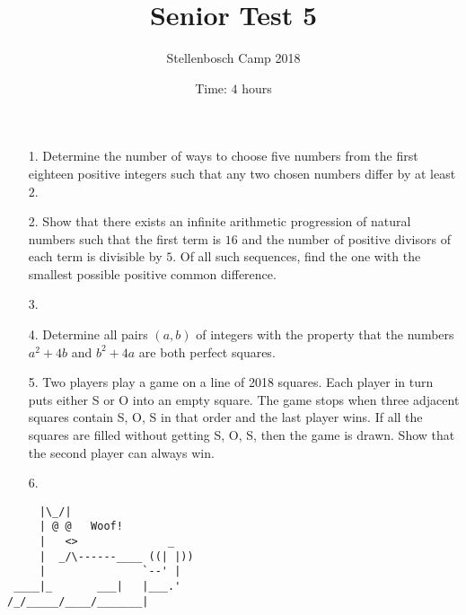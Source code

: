 \documentclass[a4paper, 12pt]{article}
\title{Senior Test 5}
\author{Stellenbosch Camp 2018}
\date{Time: $4$ hours}
\begin{document}
 \maketitle

\begin{enumerate}

\item[1.] Determine the number of ways to choose five numbers from the first eighteen positive integers such that any two chosen numbers differ by at least $2$.


\vspace{6pt}

\item[2.]  Show that there exists an infinite arithmetic progression of natural numbers such that the first term is $16$ and the number of positive divisors of each term is divisible by $5$. Of all such sequences, find the one with the smallest possible positive common difference.


\vspace{6pt}

% 
\item[3.]   


\vspace{6pt}

\item[4.] Determine all pairs $(a,b)$ of integers with the property that the numbers $a^2+4b$ and $b^2+4a$ are both perfect squares.


\vspace{6pt}

\item[5.]   Two players play a game on a line of 2018 squares. Each player in turn puts either S or O into an empty square. The game stops when three adjacent squares contain S, O, S in that order and the last player wins. If all the squares are filled without getting S, O, S, then the game is drawn. Show that the second player can always win.


\item[6.]



\end{enumerate}

\vfill

\centering
\begin{BVerbatim}
     |\_/|                  
     | @ @   Woof! 
     |   <>              _  
     |  _/\------____ ((| |))
     |               `--' |   
 ____|_       ___|   |___.' 
/_/_____/____/_______|
\end{BVerbatim}

\vspace{12mm}
\end{document}
